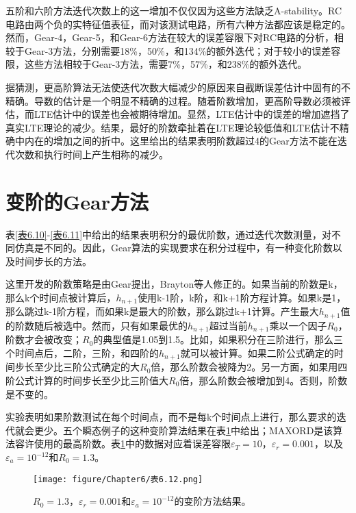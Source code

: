 五阶和六阶方法迭代次数上的这一增加不仅仅因为这些方法缺乏A-stability。RC电路由两个负的实特征值表征，而对该测试电路，所有六种方法都应该是稳定的。然而，Gear-4，Gear-5，和Gear-6方法在较大的误差容限下对RC电路的分析，相较于Gear-3方法，分别需要18\%，50\%，和134\%的额外迭代；对于较小的误差容限，这些方法相较于Gear-3方法，需要7\%，57\%，和238\%的额外迭代。

据猜测，更高阶算法无法使迭代次数大幅减少的原因来自截断误差估计中固有的不精确。导数的估计是一个明显不精确的过程\cite{ref-44}。随着阶数增加，更高阶导数必须被评估，而LTE估计中的误差也会被期待增加。显然，LTE估计中的误差的增加遮挡了真实LTE理论的减少。结果，最好的阶数牵扯着在LTE理论较低值和LTE估计不精确中内在的增加之间的折中。这里给出的结果表明阶数超过4的Gear方法不能在迭代次数和执行时间上产生相称的减少。

\section{变阶的Gear方法}
表\ref{表6.10}-\ref{表6.11}中给出的结果表明积分的最优阶数，通过迭代次数测量，对不同仿真是不同的。因此，Gear算法的实现要求在积分过程中，有一种变化阶数以及时间步长的方法。

这里开发的阶数策略是由Gear\cite{ref-66,ref-67}提出，Brayton等人\cite{ref-70}修正的。如果当前的阶数是k，那么k个时间点被计算后，$h_{n+1}$使用k-1阶，k阶，和k+1阶方程计算。如果k是1，那么跳过k-1阶方程，而如果k是最大的阶数，那么跳过k+1计算。产生最大$h_{n+1}$值的阶数随后被选中。然而，只有如果最优的$h_{n+1}$超过当前$h_{n+1}$乘以一个因子$R_0$\cite{ref-75}，阶数才会被改变；$R_0$的典型值是1.05到1.5。比如，如果积分在三阶进行，那么三个时间点后，二阶，三阶，和四阶的$h_{n+1}$就可以被计算。如果二阶公式确定的时间步长至少比三阶公式确定的大$R_0$倍，那么阶数会被降为2。另一方面，如果用四阶公式计算的时间步长至少比三阶值大$R_0$倍，那么阶数会被增加到4。否则，阶数是不变的。

实验表明如果阶数测试在每个时间点，而不是每k个时间点上进行，那么要求的迭代就会更少。五个瞬态例子的这种变阶算法结果在表\ref{表6.12}中给出；MAXORD是该算法容许使用的最高阶数。表\ref{表6.12}中的数据对应着误差容限$\varepsilon_T = 10$，$\varepsilon_r = 0.001$，以及$\varepsilon_a = 10^{-12}$和$R_0 = 1.3$。

\begin{figure}[htbp]
\small
    \centering
    \texttt{[image: figure/Chapter6/表6.12.png]}
    \caption{$R_0 = 1.3$，$\varepsilon_r = 0.001$和$\varepsilon_a = 10^{-12}$的变阶方法结果。}
    \label{表6.12}
\end{figure}

